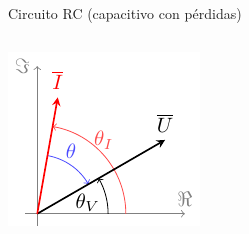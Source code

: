 \documentclass[aspectratio=169, usenames,svgnames,dvipsnames]{beamer}
\begin{document}
\begin{frame}{Circuito RC \hspace{3mm}(capacitivo con pérdidas)}
\begin{columns}
    \vspace{-7mm}
    \begin{column}{0.5\columnwidth}
        \begin{center}
        \includegraphics[height=0.6\textheight]{../figs/fasorCondensadorReal_VI.pdf}
        \end{center}
    \end{column}
    \end{columns}
\end{frame}

\end{document}
